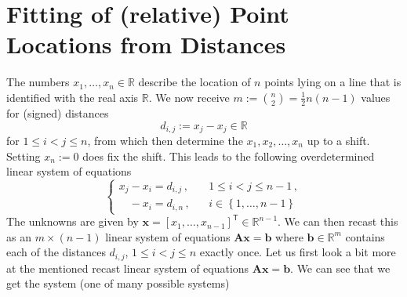 \documentclass{article}
\begin{document}
\section*{Fitting of (relative) Point Locations from Distances}

The numbers $x_{1}, \dots, x_{n} \in \mathbb{R}$ describe the location of $n$ points lying on a line that is identified with the real axis $\mathbb{R}$. We now receive $m := \binom{n}{2} = \frac{1}{2}n\left(n-1\right)$ values for (signed) distances
\begin{equation*}
    d_{i,j} := x_{j} - x_{j} \in \mathbb{R}
\end{equation*}
for $1 \leq i < j \leq n$, from which then determine the $x_{1}, x_{2}, \dots, x_{n}$ up to a shift. Setting $x_{n} := 0$ does fix the shift. This leads to the following overdetermined linear system of equations
\begin{equation*}
    \begin{cases}
    x_{j}-x_{i} = d_{i,j}\,,\quad &1 \leq i < j \leq n - 1\,,\\
    \phantom{x_{j}}-x_{i} = d_{i,n}\,,&i\in\left\{1, \dots, n-1\right\}
    \end{cases}
\end{equation*}
The unknowns are given by $\mathbf{x} = \left[x_{1}, \dots, x_{n-1}\right]^{\mathsf{T}} \in \mathbb{R}^{n-1}$. We can then recast this as an $m \times \left(n-1\right)$ linear system of equations $\mathbf{A}\mathbf{x} = \mathbf{b}$ where $\mathbf{b} \in \mathbb{R}^{m}$ contains each of the distances $d_{i,j}$, $1 \leq i < j \leq n$ exactly once. Let us first look a bit more at the mentioned recast linear system of equations $\mathbf{A}\mathbf{x} = \mathbf{b}$. We can see that we get the system (one of many possible systems)
\end{document}
